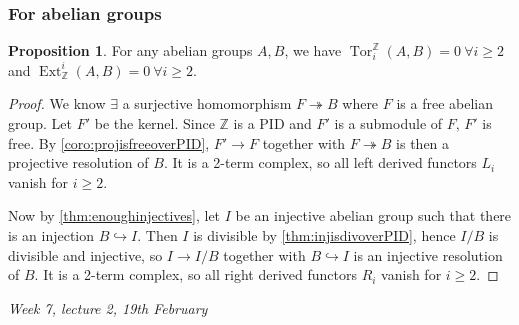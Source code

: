 \documentclass{article}
\newcommand{\Z}{\mathbb{Z}}
\newcommand{\Tor}{\operatorname{Tor}}
\newcommand{\Ext}{\operatorname{Ext}}
\theoremstyle{definition}
\newtheorem{prop}[defn]{Proposition}
\begin{document}
\subsubsection{For abelian groups}
\begin{prop}
For any abelian groups $A,B$, we have $\Tor_i^\Z(A,B)=0 \ \forall i\geq 2$ and $\Ext_\Z^i(A,B)=0 \ \forall i\geq 2$.
\end{prop}
\begin{proof}
We know $\exists$ a surjective homomorphism $F\twoheadrightarrow B$ where $F$ is a free abelian group. Let $F'$ be the kernel. Since $\Z$ is a PID and $F'$ is a submodule of $F$, $F'$ is free. By \ref{coro:projisfreeoverPID}, $F'\rightarrow F$ together with $F\twoheadrightarrow B$ is then a projective resolution of $B$. It is a 2-term complex, so all left derived functors $L_i$ vanish for $i\geq 2$.

Now by \ref{thm:enoughinjectives}, let $I$ be an injective abelian group such that there is an injection $B\hookrightarrow I$. Then $I$ is divisible by \ref{thm:injisdivoverPID}, hence $I/B$ is divisible and injective, so $I\rightarrow I/B$ together with $B\hookrightarrow I$ is an injective resolution of $B$. It is a 2-term complex, so all right derived functors $R_i$ vanish for $i\geq 2$.
\end{proof}

\begin{flushright}
\textit{Week 7, lecture 2, 19th February}
\end{flushright}
\end{document}
